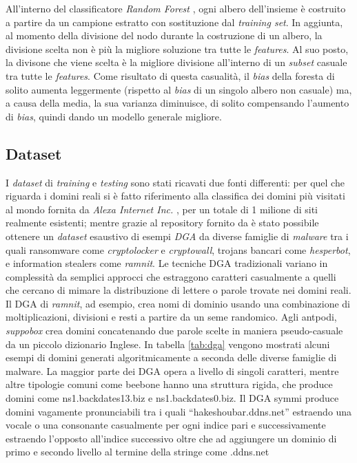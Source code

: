 All'interno del classificatore \textit{Random Forest} \cite{randomforest}, ogni albero dell'insieme è costruito a partire da un campione estratto con sostituzione dal \textit{training set}. In aggiunta, al momento della divisione del nodo durante la costruzione di un albero, la divisione scelta non è più la migliore soluzione tra tutte le \textit{features}. Al suo posto, la divisone che viene scelta è la migliore divisione all'interno di un \textit{subset} casuale tra tutte le \textit{features}. Come risultato di questa casualità, il \textit{bias} della foresta di solito aumenta leggermente (rispetto al \textit{bias} di un singolo albero non casuale) ma, a causa della media, la sua varianza diminuisce, di solito compensando l'aumento di \textit{bias}, quindi dando un modello generale migliore.

\subsection{Dataset}
\label{pro:randomforestdataset}
I \textit{dataset} di \textit{training} e \textit{testing} sono stati ricavati due fonti differenti: per quel che riguarda i domini reali si è fatto riferimento alla classifica dei domini più visitati al mondo fornita da \textit{Alexa Internet Inc.} \cite{amazon:alexa} , per un totale di 1 milione di siti realmente esistenti; mentre grazie al repository fornito da \cite{github:dgarepo} è stato possibile ottenere un \textit{dataset} esaustivo di esempi \textit{DGA} da diverse famiglie di \textit{malware} tra i quali ransomware come \textit{cryptolocker} e \textit{cryptowall}, trojans bancari come \textit{hesperbot}, e information stealers come \textit{ramnit}. Le tecniche DGA tradizionali variano in complessità da semplici approcci che estraggono caratteri casualmente a quelli che cercano di mimare la distribuzione di lettere o parole trovate nei domini reali. Il DGA di \textit{ramnit}, ad esempio, crea nomi di dominio usando una combinazione di moltiplicazioni, divisioni e resti a partire da un seme randomico. Agli antpodi, \textit{suppobox} crea domini concatenando due parole scelte in maniera pseudo-casuale da un piccolo dizionario Inglese.
In tabella \ref{tab:dga} vengono mostrati alcuni esempi di domini generati algoritmicamente a seconda delle diverse famiglie di malware.
La maggior parte dei DGA opera a livello di singoli caratteri, mentre altre tipologie comuni come beebone hanno una struttura rigida, che produce domini come ns1.backdates13.biz e ns1.backdates0.biz.
Il DGA symmi produce domini vagamente pronunciabili tra i quali “hakeshoubar.ddns.net” estraendo una vocale o una consonante casualmente per ogni indice pari e successivamente estraendo l’opposto all’indice successivo oltre che ad aggiungere un dominio di primo e secondo livello al termine della stringe come .ddns.net
